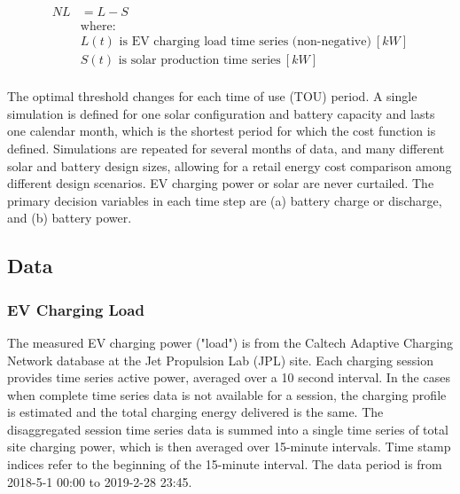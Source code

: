 \documentclass[journal,article,submit,pdftex,moreauthors]{Definitions/mdpi}
\begin{document}
\begin{equation}
  \label{eq:net-load}
  \begin{split}
    NL &= L - S \\
    &\text{where:} \\
    &L(t) \text{ is EV charging load time series (non-negative)}\ [kW]\\
    &S(t) \text{ is solar production time series}\ [kW] \\
  \end{split}
\end{equation}

The optimal threshold changes for each time of use (TOU)
period. A single simulation is defined for one solar configuration and
battery capacity and lasts one calendar month, which is the shortest
period for which the cost function is defined. Simulations are repeated
for several months of data, and many different solar and battery design
sizes, allowing for a retail energy cost comparison among different
design scenarios. EV charging power or solar are never curtailed. The
primary decision variables in each time step are (a) battery charge or
discharge, and (b) battery power.

\subsection{Data}\label{data}%

\subsubsection{{EV Charging Load }}\label{ev-charging-load}%

The measured EV charging power ("load") is from the Caltech Adaptive
Charging Network database at the Jet Propulsion Lab (JPL) site. Each
charging session provides time series active power, averaged over a 10
second interval. In the cases when complete time series data is not
available for a session, the charging profile is estimated and the total
charging energy delivered is the same. The disaggregated session time
series data is summed into a single time series of total site charging
power, which is then averaged over 15-minute intervals. Time stamp
indices refer to the beginning of the 15-minute interval. The data
period is from 2018-5-1 00:00 to 2019-2-28 23:45.
\end{document}
